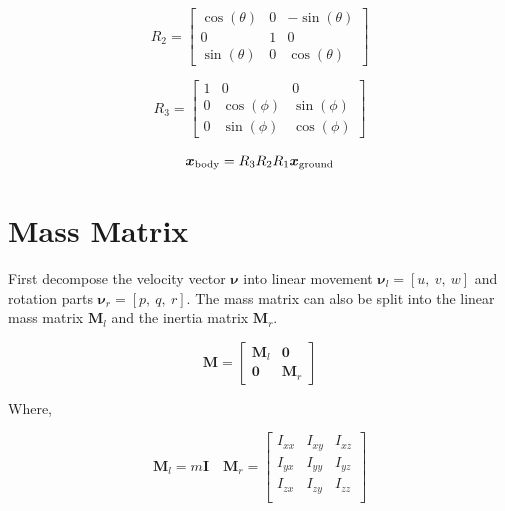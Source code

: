 \begin{equation}
    R_2=\left[\begin{array}{rrr}
        \cos(\theta) & 0 & -\sin(\theta)  \\
        0 & 1 & 0 \\
        \sin(\theta) & 0 & \cos(\theta) 
    \end{array}\right]
\end{equation}

\begin{equation}
    R_3=\left[\begin{array}{rrr}
        1 & 0 & 0  \\
        0 & \cos(\phi) & \sin(\phi) \\
        0 & \sin(\phi) & \cos(\phi) 
    \end{array}\right]
\end{equation}

\begin{equation}
    \boldsymbol{x}_{\rm body}=R_3R_2R_1\boldsymbol{x}_{\rm ground}
\end{equation}

\section{Mass Matrix}

First decompose the velocity vector $\boldsymbol{\nu}$ into linear movement $\boldsymbol{\nu}_l=[u,\ v,\ w]$ and rotation parts $\boldsymbol{\nu}_r=[p,\ q,\ r]$. The mass matrix can also be split into the linear mass matrix $\mathbf{M}_l$ and the inertia matrix $\mathbf{M}_r$.

\begin{equation}
    \mathbf{M}=\left[\begin{array}{cc}
        \mathbf{M}_l & \boldsymbol{0} \\
        \boldsymbol{0} & \mathbf{M}_r
    \end{array}\right]
\end{equation}

Where,

\begin{equation}
    \mathbf{M}_l = m\mathbf{I}\quad \mathbf{M}_r=\left[\begin{array}{ccc}
        I_{xx} & I_{xy} & I_{xz} \\
        I_{yx} & I_{yy} & I_{yz} \\
        I_{zx} & I_{zy} & I_{zz} \\
    \end{array}\right]
\end{equation}


